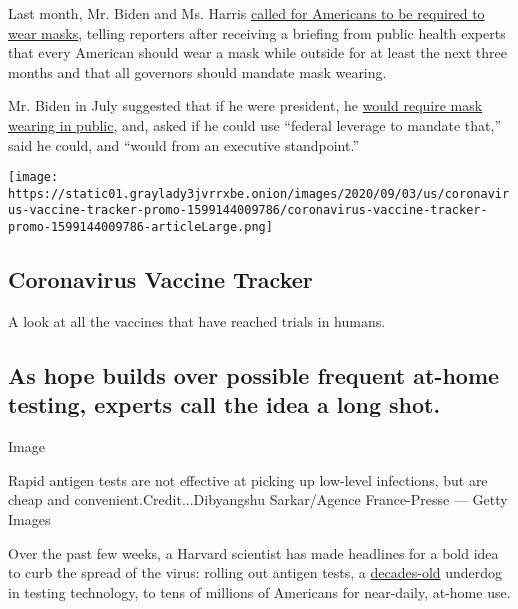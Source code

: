Last month, Mr. Biden and Ms. Harris
\href{https://www.nytimes3xbfgragh.onion/2020/08/13/us/politics/wear-masks-mandate-biden.html}{called
for Americans to be required to wear masks}, telling reporters after
receiving a briefing from public health experts that every American
should wear a mask while outside for at least the next three months and
that all governors should mandate mask wearing.

Mr. Biden in July suggested that if he were president, he
\href{https://www.nytimes3xbfgragh.onion/2020/06/25/us/politics/biden-speech-trump-coronavirus.html}{would
require mask wearing in public}, and, asked if he could use ``federal
leverage to mandate that,'' said he could, and ``would from an executive
standpoint.''

\href{https://www.nytimes3xbfgragh.onion/interactive/2020/science/coronavirus-vaccine-tracker.html}{}

\texttt{[image: https://static01.graylady3jvrrxbe.onion/images/2020/09/03/us/coronavirus-vaccine-tracker-promo-1599144009786/coronavirus-vaccine-tracker-promo-1599144009786-articleLarge.png]}

\hypertarget{coronavirus-vaccine-tracker}{%
\subsection{Coronavirus Vaccine
Tracker}\label{coronavirus-vaccine-tracker}}

A look at all the vaccines that have reached trials in humans.

\hypertarget{as-hope-builds-over-possible-frequent-at-home-testing-experts-call-the-idea-a-long-shot}{%
\subsection{As hope builds over possible frequent at-home testing,
experts call the idea a long
shot.}\label{as-hope-builds-over-possible-frequent-at-home-testing-experts-call-the-idea-a-long-shot}}

Image

Rapid antigen tests are not effective at picking up low-level
infections, but are cheap and convenient.Credit...Dibyangshu
Sarkar/Agence France-Presse --- Getty Images

Over the past few weeks, a Harvard scientist has made headlines for a
bold idea to curb the spread of the virus: rolling out antigen tests, a
\href{https://www.ncbi.nlm.nih.gov/pmc/articles/PMC7119943/}{decades-old}
underdog in testing technology, to tens of millions of Americans for
near-daily, at-home use.


